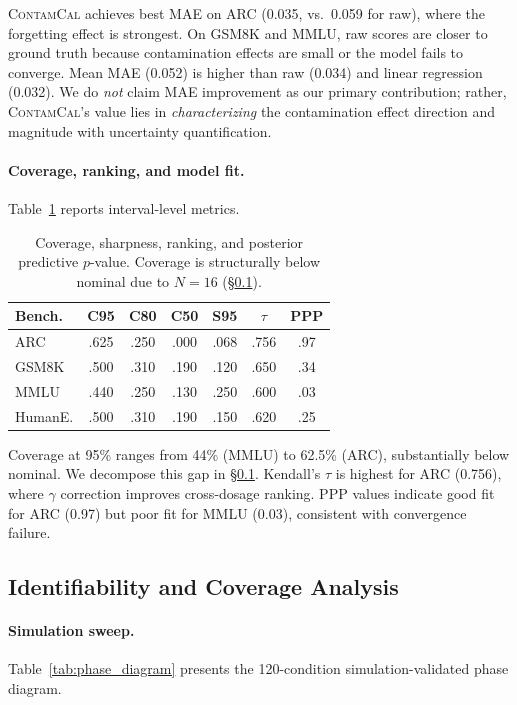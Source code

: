 \documentclass[11pt,a4paper]{article}
\newcommand{\contamcal}{\textsc{ContamCal}}
\begin{document}
\contamcal{} achieves best MAE on ARC (0.035, vs.\ 0.059 for raw), where the forgetting effect is strongest. On GSM8K and MMLU, raw scores are closer to ground truth because contamination effects are small or the model fails to converge. Mean MAE (0.052) is higher than raw (0.034) and linear regression (0.032). We do \emph{not} claim MAE improvement as our primary contribution; rather, \contamcal{}'s value lies in \emph{characterizing} the contamination effect direction and magnitude with uncertainty quantification.

\paragraph{Coverage, ranking, and model fit.} Table~\ref{tab:coverage} reports interval-level metrics.

\begin{table}[t]
\centering
\small
\caption{Coverage, sharpness, ranking, and posterior predictive $p$-value. Coverage is structurally below nominal due to $N{=}16$ (\S\ref{sec:identifiability}).}
\label{tab:coverage}
\begin{tabular}{lcccccc}
\toprule
Bench. & C95 & C80 & C50 & S95 & $\tau$ & PPP \\
\midrule
ARC & .625 & .250 & .000 & .068 & .756 & .97 \\
GSM8K & .500 & .310 & .190 & .120 & .650 & .34 \\
MMLU & .440 & .250 & .130 & .250 & .600 & .03 \\
HumanE. & .500 & .310 & .190 & .150 & .620 & .25 \\
\bottomrule
\end{tabular}
\end{table}

Coverage at 95\% ranges from 44\% (MMLU) to 62.5\% (ARC), substantially below nominal. We decompose this gap in \S\ref{sec:identifiability}. Kendall's $\tau$ is highest for ARC (0.756), where $\gamma$ correction improves cross-dosage ranking. PPP values indicate good fit for ARC (0.97) but poor fit for MMLU (0.03), consistent with convergence failure.

\subsection{Identifiability and Coverage Analysis}
\label{sec:identifiability}

\paragraph{Simulation sweep.} Table~\ref{tab:phase_diagram} presents the 120-condition simulation-validated phase diagram.
\end{document}
